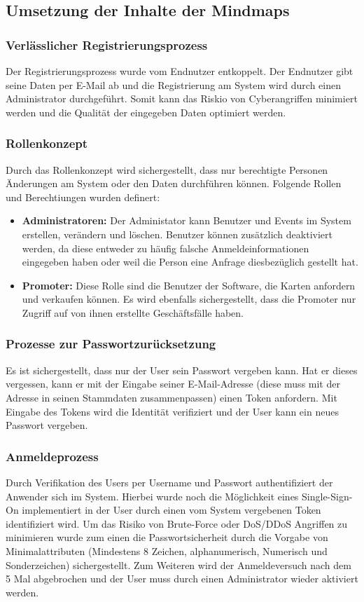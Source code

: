 \subsection{Umsetzung der Inhalte der Mindmaps}
\subsubsection{Verlässlicher Registrierungsprozess}
Der Registrierungsprozess wurde vom Endnutzer entkoppelt. Der Endnutzer gibt seine Daten per E-Mail ab und die Registrierung am System wird durch einen Administrator durchgeführt. Somit kann das Riskio von Cyberangriffen minimiert werden und die Qualität der eingegeben Daten optimiert werden.
\subsubsection{Rollenkonzept}
Durch das Rollenkonzept wird sichergestellt, dass nur berechtigte Personen Änderungen am System oder den Daten durchführen können. Folgende Rollen und Berechtiungen wurden definert: 
\begin{itemize}
	\item \textbf{Administratoren:} Der Administator kann Benutzer und Events im System erstellen, verändern und löschen. Benutzer können zusätzlich deaktiviert werden, da diese entweder zu häufig falsche Anmeldeinformationen eingegeben haben oder weil die Person eine Anfrage diesbezüglich gestellt hat.
	\item \textbf{Promoter:} Diese Rolle sind die Benutzer der Software, die Karten anfordern und verkaufen können. Es wird ebenfalls sichergestellt, dass die Promoter nur Zugriff auf von ihnen erstellte Geschäftsfälle haben.
\end{itemize}

\subsubsection{Prozesse zur Passwortzurücksetzung}
Es ist sichergestellt, dass nur der User sein Passwort vergeben kann. Hat er dieses vergessen, kann er mit der Eingabe seiner E-Mail-Adresse (diese muss mit der Adresse in seinen Stammdaten zusammenpassen) einen Token anfordern. Mit Eingabe des Tokens wird die Identität verifiziert und der User kann ein neues Passwort vergeben.
\subsubsection{Anmeldeprozess}
Durch Verifikation des Users per Username und Passwort authentifiziert der Anwender sich im System. Hierbei wurde noch die Möglichkeit eines Single-Sign-On implementiert in der User durch einen vom System vergebenen Token identifiziert wird. Um das Risiko von Brute-Force oder DoS/DDoS Angriffen zu minimieren wurde zum einen die Passwortsicherheit durch die Vorgabe von Minimalattributen (Mindestens 8 Zeichen, alphanumerisch, Numerisch und Sonderzeichen) sichergestellt. Zum Weiteren wird der Anmeldeversuch nach dem 5 Mal abgebrochen und der User muss durch einen Administrator wieder aktiviert werden.

